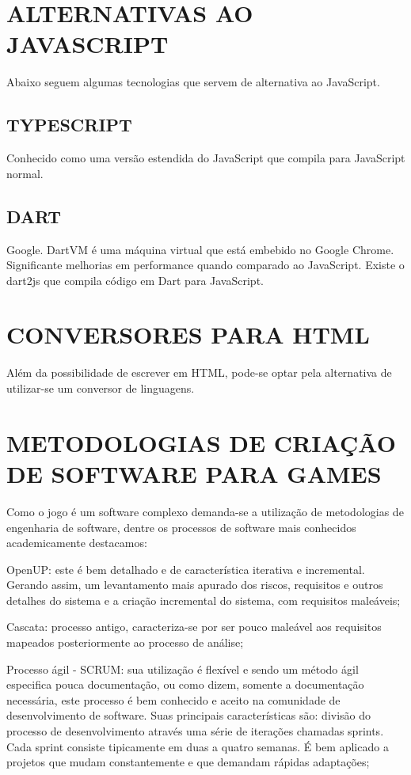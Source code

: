 \chapter{ALTERNATIVAS AO JAVASCRIPT}

Abaixo seguem algumas tecnologias que servem de alternativa ao
JavaScript.

\section{TYPESCRIPT}

Conhecido como uma versão estendida do JavaScript que compila para
JavaScript normal.

\section{DART}

Google. DartVM é uma máquina virtual que está embebido no Google
Chrome. Significante melhorias em performance quando comparado
ao JavaScript. Existe o dart2js que compila código em Dart para
JavaScript.

\chapter{CONVERSORES PARA HTML}

Além da possibilidade de escrever em HTML, pode-se optar pela
alternativa de utilizar-se um conversor de linguagens.

\chapter{METODOLOGIAS DE CRIAÇÃO DE SOFTWARE PARA GAMES}

Como o jogo é um software complexo demanda-se a utilização de
metodologias de engenharia de software, dentre os processos de software
mais conhecidos academicamente destacamos:

OpenUP: este é bem detalhado e de característica iterativa e
incremental. Gerando assim, um levantamento mais apurado dos riscos,
requisitos e outros detalhes do sistema e a criação incremental do
sistema, com requisitos maleáveis;

Cascata: processo antigo, caracteriza-se por ser pouco maleável aos
requisitos mapeados posteriormente ao processo de análise;

Processo ágil - SCRUM: sua utilização é flexível e sendo
um método ágil especifica pouca documentação, ou como dizem,
somente a documentação necessária, este processo é bem conhecido e
aceito na comunidade de desenvolvimento de software. Suas principais
características são: divisão do processo de desenvolvimento através
uma série de iterações chamadas sprints. Cada sprint consiste
tipicamente em duas a quatro semanas. É bem aplicado a projetos que
mudam constantemente e que demandam rápidas adaptações;

